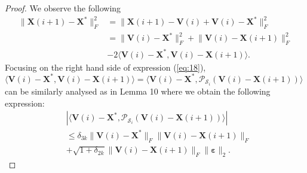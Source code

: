 \documentclass[twocolumn]{svjour3}
\newcommand{\vectornormbig}[1]{\big\|#1\big\|}
\newcommand{\signal}{\boldsymbol{X}}
\newcommand{\bestsignal}{\boldsymbol{X}^\ast}
\newcommand{\noise}{\boldsymbol{\varepsilon}}
\newcommand{\rank}{k}
\begin{document}
\begin{proof}
We observe the following
\begin{align}
\vectornormbig{\signal(i+1)  - \bestsignal}_F^2 &= \vectornormbig{\signal(i+1)  - \boldsymbol{V}(i) + \boldsymbol{V}(i) - \bestsignal}_F^2 \nonumber \\ &= \vectornormbig{\boldsymbol{V}(i) - \bestsignal}_F^2 + \vectornormbig{\boldsymbol{V}(i) - \signal(i+1) }_F^2 \nonumber \\ &- 2\langle \boldsymbol{V}(i) - \bestsignal, \boldsymbol{V}(i) - \signal(i+1)  \rangle. \label{eq:18}
\end{align}
Focusing on the right hand side of expression (\ref{eq:18}), $ \langle \boldsymbol{V}(i) - \bestsignal, \boldsymbol{V}(i) - \signal(i+1)  \rangle = \langle \boldsymbol{V}(i) - \bestsignal, \mathcal{P}_{\mathcal{S}_i}(\boldsymbol{V}(i) - \signal(i+1) ) \rangle $ can be similarly analysed as in Lemma 10 where we obtain the following expression:
\begin{align}
&|\langle \boldsymbol{V}(i) - \bestsignal, \mathcal{P}_{\mathcal{S}_i}(\boldsymbol{V}(i) - \signal(i+1) ) \rangle | \nonumber \\ &\leq \delta_{3\rank} \vectornormbig{\boldsymbol{V}(i) - \bestsignal}_F \vectornormbig{\boldsymbol{V}(i) - \signal(i+1) }_F \nonumber \\ &+ \sqrt{1+\delta_{2\rank}} \vectornormbig{\boldsymbol{V}(i) - \signal(i+1) }_F \vectornormbig{\noise}_2. \label{eq:24}
\end{align}


\end{proof}
\end{document}
